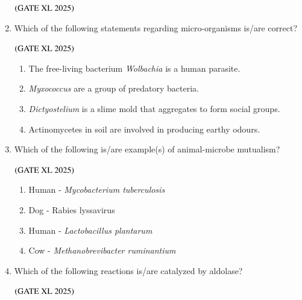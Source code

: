 \documentclass[journal]{IEEEtran}
\begin{document}
\begin{enumerate}
    \hfill $\left(\text{GATE XL 2025}\right)$

    \begin{enumerate}
    \end{enumerate}

    \item Which of the following statements regarding micro-organisms is/are correct?

    \hfill $\left(\text{GATE XL 2025}\right)$

    \begin{enumerate}
        \item The free-living bacterium \textit{Wolbachia} is a human parasite.
        \item \textit{Myxococcus} are a group of predatory bacteria.
        \item \textit{Dictyostelium} is a slime mold that aggregates to form social groups.
        \item Actinomycetes in soil are involved in producing earthy odours.
    \end{enumerate}

    \item Which of the following is/are example(s) of animal-microbe mutualism?

    \hfill $\left(\text{GATE XL 2025}\right)$

    \begin{enumerate}
        \item Human - \textit{Mycobacterium tuberculosis}
        \item Dog - Rabies lyssavirus
        \item Human - \textit{Lactobacillus plantarum}
        \item Cow - \textit{Methanobrevibacter ruminantium}
    \end{enumerate}

    \item Which of the following reactions is/are catalyzed by aldolase?

    \hfill $\left(\text{GATE XL 2025}\right)$


\end{enumerate}
\end{document}
